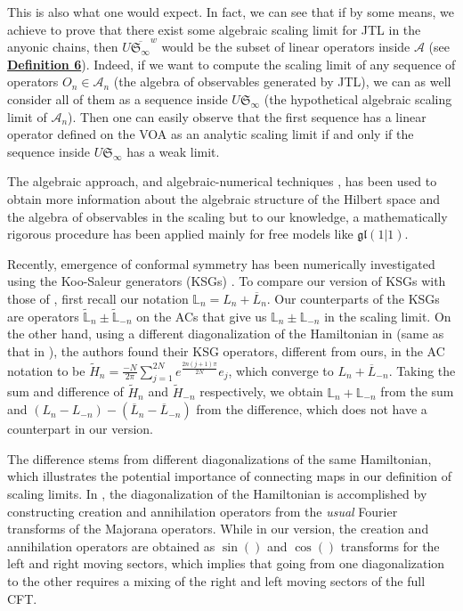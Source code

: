 \documentclass[twoside,11pt,titlepage]{amsart}
\renewcommand{\=}[1]{\stackrel{#1}{=}} %
\theoremstyle{definition}
\theoremstyle{remark}
\begin{document}
This is also what one would expect. In fact, we can see that if by some means, we achieve to prove that there exist some algebraic scaling limit for JTL in the anyonic chains, then $U\overline{\mathfrak{S}_\infty}^w$ would be the subset of linear operators inside $\mathcal{A}$ (see \hyperref[dfn6]{\textbf{Definition 6}}). Indeed, if we want to compute the scaling limit of any sequence of operators $O_n \in \mathcal{A}_n$ (the algebra of observables generated by JTL), we can as well consider all of them as a sequence inside $U\mathfrak{S}_\infty$ (the hypothetical algebraic scaling limit of $\mathcal{A}_n$). Then one can easily observe that the first sequence has a linear operator defined on the VOA as an analytic scaling limit if and only if the sequence inside $U\mathfrak{S}_\infty$ has a weak limit.
\fi

The algebraic approach, and algebraic-numerical techniques \cite{read2007enlarged,gainutdinov2015periodic}, has been used to obtain more information about the algebraic structure of the Hilbert space and the algebra of observables in the scaling but to our knowledge, a mathematically rigorous procedure has been applied mainly for free models like $\mathfrak{gl}(1|1)$. 

Recently, emergence of conformal symmetry has been numerically investigated using the Koo-Saleur generators (KSGs) \cite{milsted2017extraction,koo1994representations}.  To compare our version of KSGs with those of \cite{milsted2017extraction},  first recall our notation
$\mathbb{L}_n=L_n+\overline{L}_n.$
Our counterparts of the KSGs are operators $\widetilde{\mathbb{L}}_n\pm \widetilde{\mathbb{L}}_{-n}$ on the ACs that give us $\mathbb{L}_n\pm \mathbb{L}_{-n}$ in the scaling limit. On the other hand, using a different diagonalization of the Hamiltonian in \cite{milsted2017extraction} (same as that in \cite{koo1994representations}), the authors found their KSG operators, different from ours, in the AC notation to be  $\widetilde{H}_n=\frac{-N}{2\pi}\sum_{j=1}^{2N} e^{\frac{2n(j+1)\pi}{2N}}e_j$, which converge to $L_n+\overline{L}_{-n}$. Taking the sum and difference of $\widetilde{H}_n$ and $\widetilde{H}_{-n}$ respectively, we obtain $\mathbb{L}_n+ \mathbb{L}_{-n}$ from the sum and $(L_n-L_{-n}) -(\overline{L}_n-\overline{L}_{-n})$ from the difference, which does not have a counterpart in our version.

The difference stems from different diagonalizations of the same Hamiltonian, which illustrates the potential importance of connecting maps in our definition of scaling limits. In \cite{koo1994representations}, the diagonalization of the Hamiltonian is accomplished by constructing creation and annihilation operators from the \textit{usual} Fourier transforms of the Majorana operators. While in our version, the creation and annihilation operators are obtained as $\sin()$ and $\cos()$ transforms for the left and right moving sectors, which implies  that going from one diagonalization to the other requires a mixing of the right and left moving sectors of the full CFT. 
\end{document}
